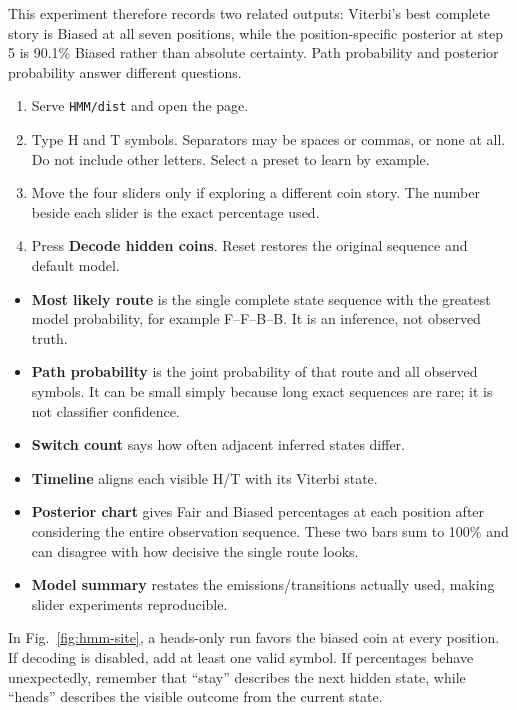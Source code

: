 \documentclass[12pt,a4paper,openany]{report}
\newcommand{\sourcepath}[1]{\texttt{#1}}
\begin{document}
This experiment therefore records two related outputs: Viterbi's best complete
story is Biased at all seven positions, while the position-specific posterior
at step 5 is 90.1\% Biased rather than absolute certainty. Path probability and
posterior probability answer different questions.

\begin{enumerate}
  \item Serve \sourcepath{HMM/dist} and open the page.
  \item Type H and T symbols. Separators may be spaces or commas, or none at
  all. Do not include other letters. Select a preset to learn by example.
  \item Move the four sliders only if exploring a different coin story. The
  number beside each slider is the exact percentage used.
  \item Press \textbf{Decode hidden coins}. Reset restores the original
  sequence and default model.
\end{enumerate}

\begin{itemize}
  \item \textbf{Most likely route} is the single complete state sequence with
  the greatest model probability, for example F--F--B--B. It is an inference,
  not observed truth.
  \item \textbf{Path probability} is the joint probability of that route and
  all observed symbols. It can be small simply because long exact sequences are
  rare; it is not classifier confidence.
  \item \textbf{Switch count} says how often adjacent inferred states differ.
  \item \textbf{Timeline} aligns each visible H/T with its Viterbi state.
  \item \textbf{Posterior chart} gives Fair and Biased percentages at each
  position after considering the entire observation sequence. These two bars
  sum to 100\% and can disagree with how decisive the single route looks.
  \item \textbf{Model summary} restates the emissions/transitions actually
  used, making slider experiments reproducible.
\end{itemize}

In Fig.~\ref{fig:hmm-site}, a heads-only run favors the biased coin at every
position. If decoding is disabled, add at
least one valid symbol. If percentages behave unexpectedly, remember that
``stay'' describes the next hidden state, while ``heads'' describes the visible
outcome from the current state.
\end{document}
